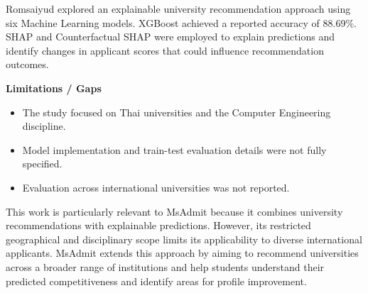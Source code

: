 Romsaiyud \cite{romsaiyud2025} explored an explainable university
recommendation approach using six Machine Learning models. XGBoost
achieved a reported accuracy of 88.69\%. SHAP and Counterfactual
SHAP were employed to explain predictions and identify changes in
applicant scores that could influence recommendation outcomes.

\noindent\textbf{Limitations / Gaps}
\begin{itemize}
    \item The study focused on Thai universities and the Computer
    Engineering discipline.
    \item Model implementation and train-test evaluation details were
    not fully specified.
    \item Evaluation across international universities was not reported.
\end{itemize}

This work is particularly relevant to MsAdmit because it combines
university recommendations with explainable predictions. However,
its restricted geographical and disciplinary scope limits its
applicability to diverse international applicants. MsAdmit extends
this approach by aiming to recommend universities across a broader
range of institutions and help students understand their predicted
competitiveness and identify areas for profile improvement.







